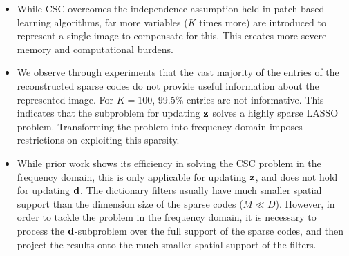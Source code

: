 \begin{itemize}
  \item While CSC overcomes the independence assumption held in
    patch-based learning algorithms, far more variables ($K$ times
    more) are introduced to represent a single image to compensate for
    this. This creates more severe memory and computational burdens.

  \item We observe through experiments that the vast majority of the
    entries of the reconstructed sparse codes do not provide useful
    information about the represented image. For $K=100$, 99.5\%
    entries are not informative. This indicates that the subproblem
    for updating $\code$ solves a highly sparse LASSO
    problem. Transforming the problem into frequency domain imposes
    restrictions on exploiting this sparsity.

  \item While prior work shows its efficiency in solving the CSC
    problem in the frequency domain, this is only applicable for
    updating $\code$, and does not hold for updating $\filter$. The
    dictionary filters usually have much smaller spatial support than
    the dimension size of the sparse codes ($M \ll D$). However, in
    order to tackle the problem in the frequency domain, it is
    necessary to process the $\filter$-subproblem over the full
    support of the sparse codes, and then project the results onto the
    much smaller spatial support of the filters.
\end{itemize}



